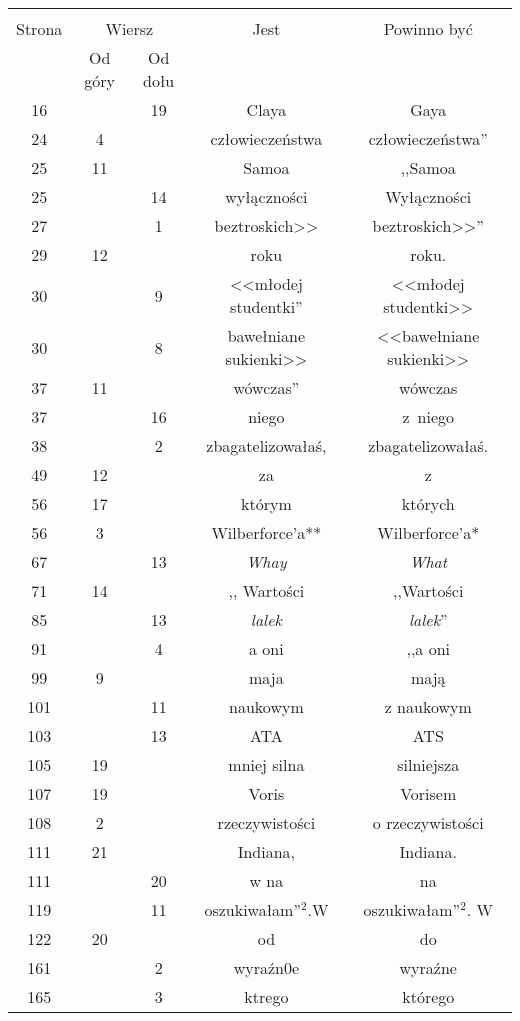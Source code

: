 \documentclass[a4paper,11pt]{article}
\begin{document}
\begin{center}
  \begin{tabular}{|c|c|c|c|c|}
    \hline
    & \multicolumn{2}{c|}{} & & \\
    Strona & \multicolumn{2}{c|}{Wiersz} & Jest
                              & Powinno być \\ \cline{2-3}
    & Od góry & Od dołu & & \\
    \hline
    16  & & 19 & Claya & Gaya \\
    24  &  4 & & człowieczeństwa & człowieczeństwa'' \\
    25  & 11 & & Samoa & ,,Samoa  %
    \\
    25  & & 14 & wyłączności & Wyłączności \\
    27  & &  1 & beztroskich>> & beztroskich>>'' \\
    29  & 12 & & roku & roku. \\
    30  & &  9 & <<młodej studentki''  %
           & <<młodej studentki>> \\
    30  & &  8 & bawełniane sukienki>> & <<bawełniane sukienki>> \\
    37  & 11 & & wówczas'' & wówczas \\
    37  & & 16 & niego & z~niego \\
    38  & &  2 & zbagatelizowałaś, & zbagatelizowałaś. \\
    49  & 12 & & za & z \\
    56  & 17 & & którym & których \\
    56  &  3 & & Wilberforce'a** & Wilberforce'a* \\
    67  & & 13 & \emph{Whay} & \emph{What} \\
    71  & 14 & & ,, Wartości  %
           & ,,Wartości  %
    \\
    85  & & 13 & \emph{lalek} & \emph{lalek}'' \\
    91  & &  4 & a oni & ,,a oni  %
    \\
    99  &  9 & & maja & mają \\
    101 & & 11 & naukowym & z naukowym \\
    103 & & 13 & ATA & ATS \\
    105 & 19 & & mniej silna & silniejsza \\
    107 & 19 & & Voris & Vorisem \\
    108 &  2 & & rzeczywistości & o rzeczywistości \\
    111 & 21 & & Indiana, & Indiana. \\
    111 & & 20 & w na & na \\
    119 & & 11 & oszukiwałam''$^{ 2 }$.W & oszukiwałam''$^{ 2 }$. W \\
    122 & 20 & & od & do \\
    161 & &  2 & wyraźn0e & wyraźne \\
    165 & &  3 & ktrego & którego \\
    \hline
  \end{tabular}


\end{center}
\end{document}
